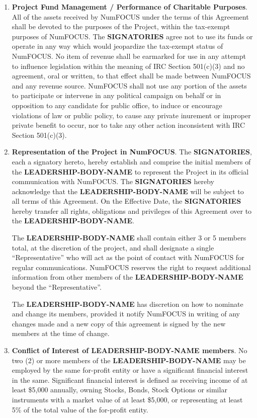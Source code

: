 \documentclass[english,letterpaper,12pt]{article}
\newcommand{\signatories}{\textbf{SIGNATORIES}}
\newcommand{\leadershipbody}{\textbf{LEADERSHIP-BODY-NAME}}
\begin{document}
\begin{enumerate}[label=\arabic*.,ref=\S~\arabic*]
  
\item \textbf{Project Fund Management / Performance of Charitable
  Purposes}. \label{CharitablePurpose} All of the assets received by NumFOCUS
  under the terms of this Agreement shall be devoted to the purposes of the
  Project, within the tax-exempt purposes of NumFOCUS. The \signatories{} agree
  not to use its funds or operate in any way which would jeopardize the
  tax-exempt status of NumFOCUS. No item of revenue shall be earmarked for use
  in any attempt to influence legislation within the meaning of IRC Section
  501(c)(3) and no agreement, oral or written, to that effect shall be made
  between NumFOCUS and any revenue source. NumFOCUS shall not use any portion
  of the assets to participate or intervene in any political campaign on behalf
  or in opposition to any candidate for public office, to induce or encourage
  violations of law or public policy, to cause any private inurement or
  improper private benefit to occur, nor to take any other action inconsistent
  with IRC Section 501(c)(3).

\item \textbf{Representation of the Project in
  NumFOCUS}. \label{Representation}The \signatories{}, each a signatory hereto,
  hereby establish and comprise the initial members of the \leadershipbody{} to
  represent the Project in its official communication with NumFOCUS.  The
  \signatories{} hereby acknowledge that the \leadershipbody{} will be subject
  to all terms of this Agreement.  On the Effective Date, the \signatories{}
  hereby transfer all rights, obligations and privileges of this Agreement over
  to the \leadershipbody{}.

  The \leadershipbody{} shall contain either 3 or 5 members total, at the
  discretion of the project, and shall designate a single ``Representative'' who
  will act as the point of contact with NumFOCUS for regular communications.
  NumFOCUS reserves the right to request additional information from other
  members of the \leadershipbody{} beyond the ``Representative''.

  The \leadershipbody{} has discretion on how to nominate and change its
  members, provided it notify NumFOCUS in writing of any changes made and a new
  copy of this agreement is signed by the new members at the time of change.

\item \textbf{Conflict of Interest of \leadershipbody{} members}. No two (2) or
  more members of the \leadershipbody{} may be employed by the same for-profit
  entity or have a significant financial interest in the same. Significant
  financial interest is defined as receiving income of at least \$5,000
  annually, owning Stocks, Bonds, Stock Options or similar instruments with a
  market value of at least \$5,000, or representing at least 5\% of the total
  value of the for-profit entity.


\end{enumerate}
\end{document}
